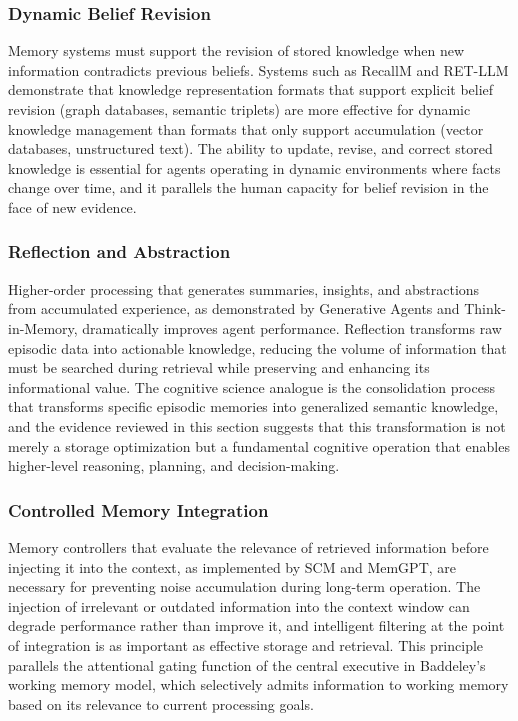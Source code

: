 \documentclass[11pt,letterpaper]{article}
\begin{document}
\subsubsection{Dynamic Belief Revision}

Memory systems must support the revision of stored knowledge when new information contradicts previous beliefs. Systems such as RecallM and RET-LLM demonstrate that knowledge representation formats that support explicit belief revision (graph databases, semantic triplets) are more effective for dynamic knowledge management than formats that only support accumulation (vector databases, unstructured text). The ability to update, revise, and correct stored knowledge is essential for agents operating in dynamic environments where facts change over time, and it parallels the human capacity for belief revision in the face of new evidence.

\subsubsection{Reflection and Abstraction}

Higher-order processing that generates summaries, insights, and abstractions from accumulated experience, as demonstrated by Generative Agents and Think-in-Memory, dramatically improves agent performance. Reflection transforms raw episodic data into actionable knowledge, reducing the volume of information that must be searched during retrieval while preserving and enhancing its informational value. The cognitive science analogue is the consolidation process that transforms specific episodic memories into generalized semantic knowledge, and the evidence reviewed in this section suggests that this transformation is not merely a storage optimization but a fundamental cognitive operation that enables higher-level reasoning, planning, and decision-making.

\subsubsection{Controlled Memory Integration}

Memory controllers that evaluate the relevance of retrieved information before injecting it into the context, as implemented by SCM and MemGPT, are necessary for preventing noise accumulation during long-term operation. The injection of irrelevant or outdated information into the context window can degrade performance rather than improve it, and intelligent filtering at the point of integration is as important as effective storage and retrieval. This principle parallels the attentional gating function of the central executive in Baddeley's working memory model, which selectively admits information to working memory based on its relevance to current processing goals.
\end{document}
